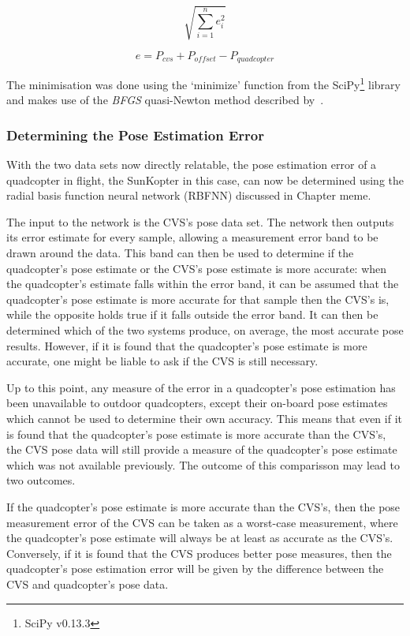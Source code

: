 \begin{equation}
  \label{eq:chap5-err-func}
  \sqrt{\displaystyle\sum_{i=1}^{n} e_i^2}
\end{equation}

\begin{equation}
  \label{eq:chap5-err-term}
  e = P_{cvs} + P_{offset} - P_{quadcopter}
\end{equation}

The minimisation was done using the `minimize' function from the SciPy\footnote{SciPy v0.13.3} library and makes use of the \emph{BFGS} quasi-Newton method described by~\cite{nocedal2006numerical}. 

\subsubsection{Determining the Pose Estimation Error}

With the two data sets now directly relatable, the pose estimation error of a quadcopter in flight, the SunKopter in this case, can now be determined using the radial basis function neural network (RBFNN) discussed in Chapter meme. 

The input to the network is the CVS's pose data set. The network then outputs its error estimate for every sample, allowing a measurement error band to be drawn around the data. This band can then be used to determine if the quadcopter's pose estimate or the CVS's pose estimate is more accurate: when the quadcopter's estimate falls within the error band, it can be assumed that the quadcopter's pose estimate is more accurate for that sample then the CVS's is, while the opposite holds true if it falls outside the error band. It can then be determined which of the two systems produce, on average, the most accurate pose results. However, if it is found that the quadcopter's pose estimate is more accurate, one might be liable to ask if the CVS is still necessary.

Up to this point, any measure of the error in a quadcopter's pose estimation has been unavailable to outdoor quadcopters, except their on-board pose estimates which cannot be used to determine their own accuracy. This means that even if it is found that the quadcopter's pose estimate is more accurate than the CVS's, the CVS pose data will still provide a measure of the quadcopter's pose estimate which was not available previously. The outcome of this comparisson may lead to two outcomes.

If the quadcopter's pose estimate is more accurate than the CVS's, then the pose measurement error of the CVS can be taken as a worst-case measurement, where the quadcopter's pose estimate will always be at least as accurate as the CVS's. Conversely, if it is found that the CVS produces better pose measures, then the quadcopter's pose estimation error will be given by the difference between the CVS and quadcopter's pose data. 

